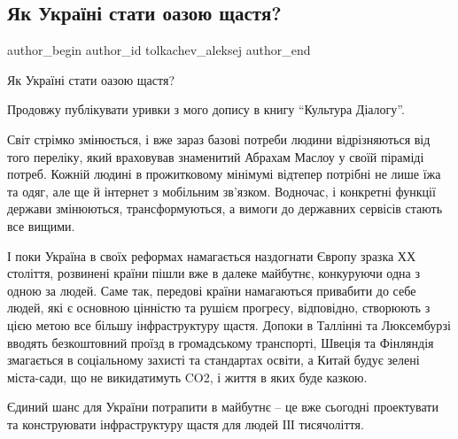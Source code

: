  
 
 
 
 
 
\subsection{Як Україні стати оазою щастя?}
\label{sec:24_01_2022.fb.tolkachev_aleksej.1.oazis_schastja}
 
\ifcmt
 author_begin
   author_id tolkachev_aleksej
 author_end
\fi

Як Україні стати оазою щастя? 

Продовжу публікувати уривки з мого допису в книгу \enquote{Культура Діалогу}. 

Світ стрімко змінюється, і вже зараз базові потреби людини відрізняються від
того переліку, який враховував знаменитий Абрахам Маслоу у своїй піраміді
потреб. Кожній людині в прожитковому мінімумі відтепер потрібні не лише їжа та
одяг, але ще й інтернет з мобільним зв’язком. Водночас, і конкретні функції
держави змінюються, трансформуються, а вимоги до державних сервісів стають все
вищими. 


І поки Україна в своїх реформах намагається наздогнати Європу зразка ХХ
століття, розвинені країни пішли вже в далеке майбутнє, конкуруючи одна з одною
за людей. Саме так, передові країни намагаються привабити до себе людей, які є
основною цінністю та рушієм прогресу, відповідно, створюють з цією метою все
більшу інфраструктуру щастя. Допоки в Таллінні та Люксембурзі вводять
безкоштовний проїзд в громадському транспорті, Швеція та Фінляндія змагається в
соціальному захисті та стандартах освіти, а Китай будує зелені міста-сади, що
не викидатимуть CO2, і життя в яких буде казкою.

Єдиний шанс для України потрапити в майбутнє – це вже сьогодні проектувати та
конструювати інфраструктуру щастя для людей ІІІ тисячоліття. 

